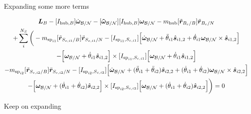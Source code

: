 \documentclass[paper]{aiaaNew}
\begin{document}
Expanding some more terms

\begin{multline}
\bm L_B -[I_{\text{hub},B}] \dot{\bm\omega}_{\cal B/N}  -[\bm{\tilde{\omega}}_{\cal B/N}] [I_{\text{hub},B}] \bm\omega_{\cal B/N} - m_{\text{hub}} [\tilde{{\bm r}}_{B_c/B}] \ddot{\bm r}_{B_c/N} \\
+ \sum\limits_{i}^{N_S}\bigg(- m_{\text{sp}_{i1}} [\tilde{{\bm r}}_{S_{c,i1}/B}] \ddot{\bm r}_{S_{c,i1}/N} -[I_{\text{sp}_{i1},S_{c,i1}}] \Big[\dot{\bm \omega}_{\cal{B/N}} + \ddot{\theta}_{i1} \hat{\bm s}_{i1,2} + \dot{\theta}_{i1} \bm \omega_{\cal{B/N}} \times \hat{\bm s}_{i1,2}\Big]  \\
-\Big[\bm \omega_{\cal{B/N}} + \dot{\theta}_{i1} \hat{\bm s}_{i1,2}\Big] \times [I_{\text{sp}_{i1},S_{c,i1}}] \Big[\bm \omega_{\cal{B/N}} + \dot{\theta}_{i1} \hat{\bm s}_{i1,2}\Big]\\
- m_{\text{sp}_{i2}} [\tilde{{\bm r}}_{S_{c,i2}/B}] \ddot{\bm r}_{S_{c,i2}/N} -[I_{\text{sp}_{i2},S_{c,i2}}] \Big[\dot{\bm \omega}_{\cal{B/N}} + (\ddot{\theta}_{i1}  + \ddot{\theta}_{i2})\hat{\bm s}_{i2,2} + (\dot{\theta}_{i1}  + \dot{\theta}_{i2}) \bm \omega_{\cal{B/N}} \times \hat{\bm s}_{i2,2}\Big]  \\
-\Big[\bm \omega_{\cal{B/N}} + (\dot{\theta}_{i1}  + \dot{\theta}_{i2})\hat{\bm s}_{i2,2}\Big] \times [I_{\text{sp}_{i2},S_{c,i2}}] \Big[\bm \omega_{\cal{B/N}} + (\dot{\theta}_{i1}  + \dot{\theta}_{i2})\hat{\bm s}_{i2,2}\Big]\bigg) = 0
\end{multline}

Keep on expanding
\end{document}
